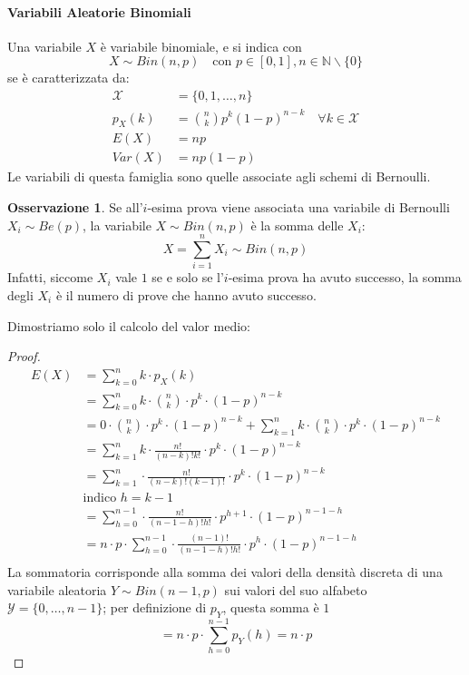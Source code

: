 \documentclass{article}
\theoremstyle{plain}
\theoremstyle{definition}
\newtheorem{osservazione}{Osservazione}[section]
\theoremstyle{remark}
\begin{document}
\paragraph{Variabili Aleatorie Binomiali} %
\label{par:variabili_aleatorie_binomiali}
Una variabile $X$ è variabile binomiale, e si indica con
\begin{equation*}
	X\sim Bin(n,p)\quad\text{con }p\in[0,1],n\in\mathds{N}\smallsetminus\{0\}
\end{equation*}
se è caratterizzata da:
\begin{align*}
	\mathcal{X}&=\{0,1,\dots,n\}\\
	p_X(k)&=\binom{n}{k} p^k (1-p)^{n-k}\quad\forall k\in\mathcal{X}\\
	E(X)&=n p\\
	Var(X)&=n p(1-p)
\end{align*}
Le variabili di questa famiglia sono quelle associate agli schemi di Bernoulli.
\begin{osservazione}
	Se all'$i$-esima prova viene associata una variabile di Bernoulli $X_i\sim Be(p)$, la variabile $X\sim Bin(n,p)$ è la somma delle $X_i$:
	\begin{equation*}
		X=\sum_{i=1}^n X_i\sim Bin(n,p)
	\end{equation*}
	Infatti, siccome $X_i$ vale $1$ se e solo se l'$i$-esima prova ha avuto successo, la somma degli $X_i$ è il numero di prove che hanno avuto successo.
\end{osservazione}
Dimostriamo solo il calcolo del valor medio:
\begin{proof}
	\begin{align*}
		E(X)&=\sum_{k=0}^n k\cdot p_X(k)\\
		&=\sum_{k=0}^n k\cdot\binom{n}{k}\cdot p^k\cdot (1-p)^{n-k}\\
		&=0\cdot\binom{n}{k}\cdot p^k\cdot (1-p)^{n-k}+\sum_{k=1}^n k\cdot\binom{n}{k}\cdot p^k\cdot (1-p)^{n-k}\\
		&=\sum_{k=1}^n k\cdot\frac{n!}{(n-k)!k!}\cdot p^k\cdot (1-p)^{n-k}\\
		&=\sum_{k=1}^n \cdot\frac{n!}{(n-k)!(k-1)!}\cdot p^k\cdot (1-p)^{n-k}\\
		&\text{indico $h=k-1$}\\
		&=\sum_{h=0}^{n-1} \cdot\frac{n!}{(n-1-h)!h!}\cdot p^{h+1}\cdot (1-p)^{n-1-h}\\
		&=n\cdot p\cdot\sum_{h=0}^{n-1} \cdot\frac{(n-1)!}{(n-1-h)!h!}\cdot p^h\cdot (1-p)^{n-1-h}\\
	\end{align*}
	La sommatoria corrisponde alla somma dei valori della densità discreta di una variabile aleatoria $Y\sim Bin(n-1,p)$ sui valori del suo alfabeto $\mathcal{Y}=\{0,\dots,n-1\}$; per definizione di $p_Y$, questa somma è $1$
	\begin{equation*}
		=n\cdot p\cdot\sum_{h=0}^{n-1} p_Y(h)=n\cdot p
	\end{equation*}
\end{proof}
\end{document}
